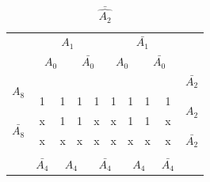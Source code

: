 \documentclass[a4paper,14pt]{article}
\begin{document}
\begin{table}[!htb]
	\begin{minipage}{.5\linewidth}
		\caption{$\hat{A_2}$}
		\centering
		\begin{tabular}{cccccccccc}
			& \multicolumn{4}{c}{$A_1$}                                                                         & \multicolumn{4}{c}{$\bar{A_1}$}                                                                   &                        \\
			& \multicolumn{2}{c}{$A_0$}                       & \multicolumn{2}{c}{$\bar{A_0}$}                 & \multicolumn{2}{c}{$A_0$}                       & \multicolumn{2}{c}{$\bar{A_0}$}                 &                        \\ \cline{2-9}
			\multicolumn{1}{c|}{\multirow{2}{*}{$A_8$}}       & \multicolumn{1}{c|}{}  & \multicolumn{1}{c|}{}  & \multicolumn{1}{c|}{}  & \multicolumn{1}{c|}{}  & \multicolumn{1}{c|}{}  & \multicolumn{1}{c|}{}  & \multicolumn{1}{c|}{}  & \multicolumn{1}{c|}{}  & $\bar{A_2}$            \\ \cline{2-9}
			\multicolumn{1}{c|}{}                             & \multicolumn{1}{c|}{1} & \multicolumn{1}{c|}{1} & \multicolumn{1}{c|}{1} & \multicolumn{1}{c|}{1} & \multicolumn{1}{c|}{1} & \multicolumn{1}{c|}{1} & \multicolumn{1}{c|}{1} & \multicolumn{1}{c|}{1} & \multirow{2}{*}{$A_2$} \\ \cline{2-9}
			\multicolumn{1}{c|}{\multirow{2}{*}{$\bar{A_8}$}} & \multicolumn{1}{c|}{x} & \multicolumn{1}{c|}{1} & \multicolumn{1}{c|}{1} & \multicolumn{1}{c|}{x} & \multicolumn{1}{c|}{x} & \multicolumn{1}{c|}{1} & \multicolumn{1}{c|}{1} & \multicolumn{1}{c|}{x} &                        \\ \cline{2-9}
			\multicolumn{1}{c|}{}                             & \multicolumn{1}{c|}{x} & \multicolumn{1}{c|}{x} & \multicolumn{1}{c|}{x} & \multicolumn{1}{c|}{x} & \multicolumn{1}{c|}{x} & \multicolumn{1}{c|}{x} & \multicolumn{1}{c|}{x} & \multicolumn{1}{c|}{x} & $\bar{A_2}$            \\ \cline{2-9}
			\\
			& $\bar{A_4}$            & \multicolumn{2}{c}{$A_4$}                       & \multicolumn{2}{c}{$\bar{A_4}$}                 & \multicolumn{2}{c}{$A_4$}                       & $\bar{A_4}$            &                       
		\end{tabular}
	\end{minipage}%
	\begin{minipage}{.5\linewidth}
		\centering
		\caption{$\bar{\hat{A_2}}$}

\end{minipage}
\end{table}
\end{document}
